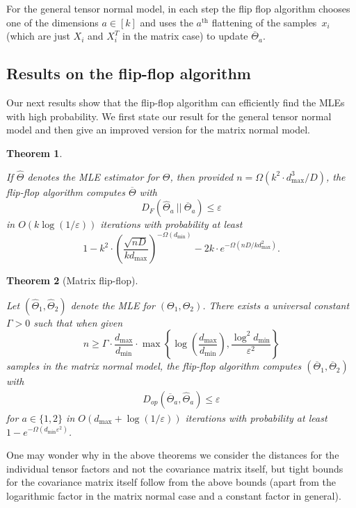 \documentclass[aos]{imsart}
\newtheorem{theorem}{Theorem}[section]
\theoremstyle{definition}
\numberwithin{equation}{section}
\newcommand{\otheta}{\overline{\Theta}}
\newcommand{\htheta}{\widehat{\Theta}}
\newcommand{\eps}{\varepsilon}
\def\dmin{d_{\min}}
\def\dmax{d_{\max}}
\begin{document}
For the general tensor normal model, in each step the flip flop algorithm chooses one of the dimensions $a \in [k]$ and uses the $a^\text{th}$ flattening of the samples~$x_i$ (which are just $X_i$ and $X_i^T$ in the matrix case) to update $\overline{\Theta}_a$.

\subsection{Results on the flip-flop algorithm}
Our next results show that the flip-flop algorithm can efficiently find the MLEs with high probability.
We first state our result for the general tensor normal model and then give an improved version for the matrix normal model.

\newcommand{\TensorFlop}{
	If $\htheta$ denotes the MLE estimator for $\Theta$, then provided $n = \Omega(k^2 \cdot \dmax^3/D)$, the flip-flop algorithm computes $\otheta$ with
	$$ D_F(\htheta_a \ || \ \otheta_a) \leq \eps $$
	in $O(k \log(1/\eps))$ iterations with probability at least
	$$ 1 - k^2 \cdot \left( \dfrac{\sqrt{nD}}{k \dmax} \right)^{-\Omega(\dmin)} - 2k \cdot e^{- \Omega(nD/k \dmax^2)}.$$}

\begin{theorem}\label{thm:tensor-flipflop}
\TensorFlop
\end{theorem}

\newcommand{\MatrixFlop}{
Let $(\widehat{\Theta}_1,\widehat{\Theta}_2)$ denote the MLE for $(\Theta_1,\Theta_2)$. There exists a universal constant $\Gamma > 0$ such that when given 
$$n \geq \Gamma \cdot \dfrac{\dmax}{\dmin} \cdot \max\left\{ \log\left( \dfrac{\dmax}{\dmin} \right), \dfrac{\log^2 \dmin}{\varepsilon^2} \right\}$$ 
samples in the matrix normal model, the flip-flop algorithm computes $(\overline{\Theta}_1,\overline{\Theta}_2)$ with
\begin{align*}
  D_{op}(\overline{\Theta}_a, \widehat{\Theta}_a) \leq \eps
\end{align*}
for $a\in\{1,2\}$ in $O\left(\dmax +  \log(1/\varepsilon) \right)$ iterations with probability at least $1 - e^{- \Omega(\dmin \varepsilon^2)}$.
}

\begin{theorem}[Matrix flip-flop]\label{thm:matrix-flipflop}
\MatrixFlop\end{theorem}

One may wonder why in the above theorems we consider the distances for the individual tensor factors and not the covariance matrix itself, but tight bounds for the covariance matrix itself follow from the above bounds (apart from the logarithmic factor in the matrix normal case and a constant factor in general).
\end{document}
